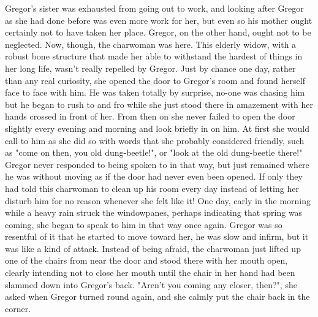 Gregor's sister was exhausted from going out to work, and looking after Gregor as she had done before was even more work for her, but even so his mother ought certainly not to have taken her place. Gregor, on the other hand, ought not to be neglected. Now, though, the charwoman was here. This elderly widow, with a robust bone structure that made her able to withstand the hardest of things in her long life, wasn't really repelled by Gregor. Just by chance one day, rather than any real curiosity, she opened the door to Gregor's room and found herself face to face with him. He was taken totally by surprise, no-one was chasing him but he began to rush to and fro while she just stood there in amazement with her hands crossed in front of her. From then on she never failed to open the door slightly every evening and morning and look briefly in on him. At first she would call to him as she did so with words that she probably considered friendly, such as "come on then, you old dung-beetle!", or "look at the old dung-beetle there!" Gregor never responded to being spoken to in that way, but just remained where he was without moving as if the door had never even been opened. If only they had told this charwoman to clean up his room every day instead of letting her disturb him for no reason whenever she felt like it! One day, early in the morning while a heavy rain struck the windowpanes, perhaps indicating that spring was coming, she began to speak to him in that way once again. Gregor was so resentful of it that he started to move toward her, he was slow and infirm, but it was like a kind of attack. Instead of being afraid, the charwoman just lifted up one of the chairs from near the door and stood there with her mouth open, clearly intending not to close her mouth until the chair in her hand had been slammed down into Gregor's back. "Aren't you coming any closer, then?", she asked when Gregor turned round again, and she calmly put the chair back in the corner.

